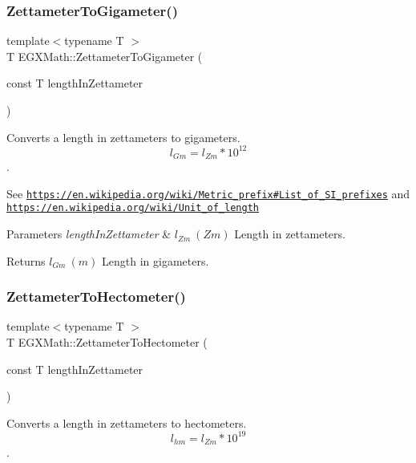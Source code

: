 \subsubsection{\texorpdfstring{Zettameter\+To\+Gigameter()}{ZettameterToGigameter()}}
{\footnotesize\ttfamily template$<$typename T $>$ \\
T E\+G\+X\+Math\+::\+Zettameter\+To\+Gigameter (\begin{DoxyParamCaption}\item[{const T}]{length\+In\+Zettameter }\end{DoxyParamCaption})}



Converts a length in zettameters to gigameters. \[ l_{Gm}=l_{Zm} * 10^{12} \]. 

See \href{https://en.wikipedia.org/wiki/Metric_prefix#List_of_SI_prefixes}{\tt https\+://en.\+wikipedia.\+org/wiki/\+Metric\+\_\+prefix\#\+List\+\_\+of\+\_\+\+S\+I\+\_\+prefixes} and \href{https://en.wikipedia.org/wiki/Unit_of_length}{\tt https\+://en.\+wikipedia.\+org/wiki/\+Unit\+\_\+of\+\_\+length} 
\begin{DoxyParams}{Parameters}
{\em length\+In\+Zettameter} & $ l_{Zm}\ (Zm)$ Length in zettameters. \\
\hline
\end{DoxyParams}
\begin{DoxyReturn}{Returns}
$ l_{Gm}\ (m)$ Length in gigameters. 
\end{DoxyReturn}
\mbox{\label{group___e_g_x_math-_conversions-_length_conversions-_s_i-_zettameter-_s_i_gada762e454268ba506fcbf3caae74f14e}} 
\subsubsection{\texorpdfstring{Zettameter\+To\+Hectometer()}{ZettameterToHectometer()}}
{\footnotesize\ttfamily template$<$typename T $>$ \\
T E\+G\+X\+Math\+::\+Zettameter\+To\+Hectometer (\begin{DoxyParamCaption}\item[{const T}]{length\+In\+Zettameter }\end{DoxyParamCaption})}



Converts a length in zettameters to hectometers. \[ l_{hm}=l_{Zm} * 10^{19} \]. 

